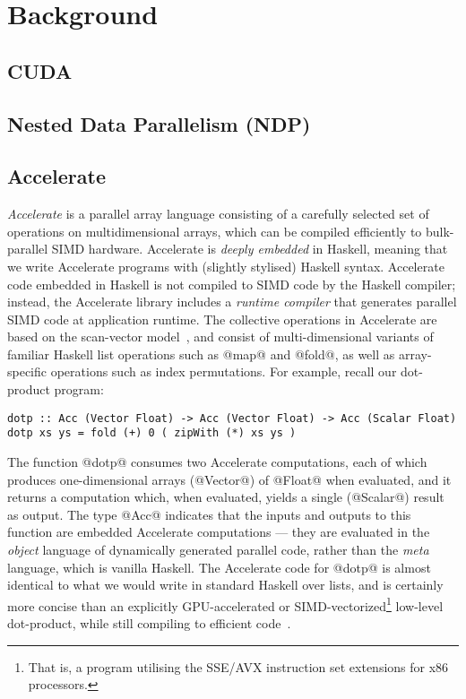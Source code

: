 \chapter{Background}

\section{CUDA}

\section{Nested Data Parallelism (NDP)}

\section{Accelerate}
\label{sec:background-accelerate}

\emph{Accelerate} is a parallel array language consisting of a carefully
selected set of operations on multidimensional arrays, which can be compiled
efficiently to bulk-parallel SIMD hardware. Accelerate is \emph{deeply embedded}
in Haskell, meaning that we write Accelerate programs with (slightly stylised)
Haskell syntax. Accelerate code embedded in Haskell is not compiled to SIMD code
by the Haskell compiler; instead, the Accelerate library includes a
\emph{runtime compiler} that generates parallel SIMD code at application
runtime.
The collective operations in Accelerate are based on the scan-vector
model~\citep{Chatterjee:1990vj,Sengupta:2007tc}, and consist of multi-dimensional
variants of familiar Haskell list operations such as @map@ and @fold@, as well
as array-specific operations such as index permutations.
For example, recall our dot-product program:
%
\begin{lstlisting}
dotp :: Acc (Vector Float) -> Acc (Vector Float) -> Acc (Scalar Float)
dotp xs ys = fold (+) 0 ( zipWith (*) xs ys )
\end{lstlisting}
%
The function @dotp@ consumes two Accelerate computations, each of which produces
one-dimensional arrays (@Vector@) of @Float@ when evaluated, and it returns a
computation which, when evaluated, yields a single (@Scalar@) result
as output. The type @Acc@ indicates that the inputs and outputs to
this function are embedded Accelerate computations --- they are
evaluated in the \emph{object} language of dynamically generated
parallel code, rather than the \emph{meta} language, which is vanilla
Haskell.
The Accelerate code for @dotp@ is almost identical to what we would write in
standard Haskell over lists, and is certainly more concise than an explicitly
GPU-accelerated or SIMD-vectorized\footnote{That is, a program utilising the
SSE/AVX instruction set extensions for x86 processors.} low-level dot-product,
while still compiling to efficient
code~\citep{Chakravarty:acc-cuda,McDonell:acc-optim,McDonell:2015:acc-llvm}.

